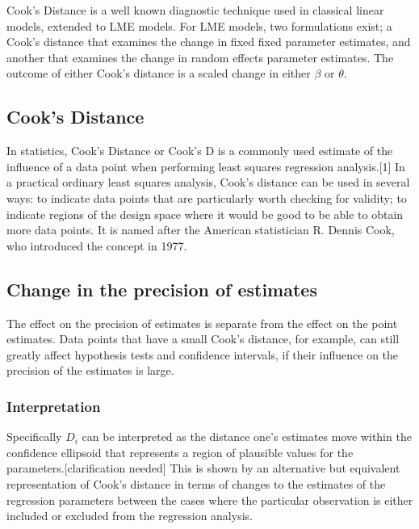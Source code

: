 \documentclass[12pt, a4paper]{report}
\theoremstyle{plain}
\theoremstyle{definition}
\theoremstyle{remark}
\begin{document}
Cook's Distance is a well known diagnostic technique used in classical linear models, extended to LME models.  For LME models, two formulations exist; a Cook's distance that examines the change in fixed fixed parameter estimates, and another that examines the change in random effects parameter estimates. The outcome of either Cook's distance is a scaled change in either $\beta$ or $\theta$.


\subsection{Cook's Distance}
In statistics, Cook's Distance or Cook's D is a commonly used estimate of the influence of a data point when performing least squares regression analysis.[1] In a practical ordinary least squares analysis, Cook's distance can be used in several ways: to indicate data points that are particularly worth checking for validity; to indicate regions of the design space where it would be good to be able to obtain more data points. It is named after the American statistician R. Dennis Cook, who introduced the concept in 1977.



\subsection{Change in the precision of estimates}

The effect on the precision of estimates is separate from the effect on the point estimates. Data points that
have a small Cook's distance, for example, can still greatly affect hypothesis tests and confidence intervals, if their  influence on the precision of the estimates is large.






\subsubsection{Interpretation}
Specifically $D_i$ can be interpreted as the distance one's estimates move within the confidence ellipsoid that represents a region of plausible values for the parameters.[clarification needed] This is shown by an alternative but equivalent representation of Cook's distance in terms of changes to the estimates of the regression parameters between the cases where the particular observation is either included or excluded from the regression analysis.
\end{document}
